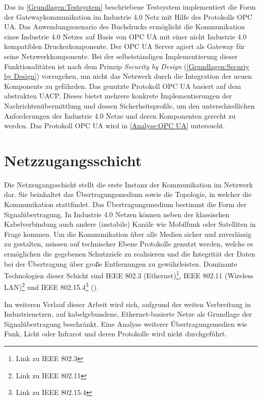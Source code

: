 Das in \autoref{Grundlagen:Testsystem} beschriebene Testsystem implementiert die Form der Gatewaykommunikation im Industrie 4.0 Netz mit Hilfe des Protokolls \ac{OPC UA}. Das Anwendungsszenario des Buchdrucks ermöglicht die Kommunikation eines Industrie 4.0 Netzes auf Basis von \ac{OPC UA} mit einer nicht Industrie 4.0 kompatiblen Druckerkomponente. Der \ac{OPC UA} Server agiert als Gateway für seine Netzwerkkomponente. Bei der selbstständigen Implementierung dieser Funktionalitäten ist nach dem Prinzip \textit{Security by Design} (\autoref{Grundlagen:Securiy by Design}) vorzugehen, um nicht das Netzwerk durch die Integration der neuen Komponente zu gefährden. Das genutzte Protokoll \ac{OPC UA} basiert auf dem abstrakten \ac{UACP}. Dieses bietet mehrere konkrete Implementierungen der Nachrichtenübermittlung und dessen Sicherheitsprofile, um den unterschiedlichen Anforderungen der Industrie 4.0 Netze und deren Komponenten gerecht zu werden. Das Protokoll \ac{OPC UA} wird in \autoref{Analyse:OPC UA} untersucht.

\section{Netzzugangsschicht}
Die Netzzugangsschicht stellt die erste Instanz der Kommunikation im Netzwerk dar. Sie beinhaltet das Übertragungsmedium sowie die Topologie, in welcher die Kommunikation stattfindet. Das Übertragungsmedium bestimmt die Form der Signalübertragung. In Industrie 4.0 Netzen können neben der klassischen Kabelverbindung auch andere (instabile) Kanäle wie Mobilfunk oder Satelliten in Frage kommen. Um die Kommunikation über alle Medien sicher und zuverlässig zu gestalten, müssen auf technischer Ebene Protokolle genutzt werden, welche es ermöglichen die gegebenen Schutzziele zu realisieren und die Integrität der Daten bei der Übertragung über große Entfernungen zu gewährleisten. Dominante Technologien dieser Schicht sind \ac{IEEE} 802.3 (Ethernet)\footnote{Link zu IEEE 802.3}, \ac{IEEE} 802.11 (Wireless LAN)\footnote{Link zu IEEE 802.11} und \ac{IEEE} 802.15.4\footnote{Link zu IEEE 802.15.4} (\cite{sichKom2017}).

Im weiteren Verlauf dieser Arbeit wird sich, aufgrund der weiten Verbreitung in Industrienetzen, auf kabelgebundene, Ethernet-basierte Netze als Grundlage der Signalübertragung beschränkt. Eine Analyse weiterer Übertragungsmedien wie Funk, Licht oder Infrarot und deren Protokolle wird nicht durchgeführt.

